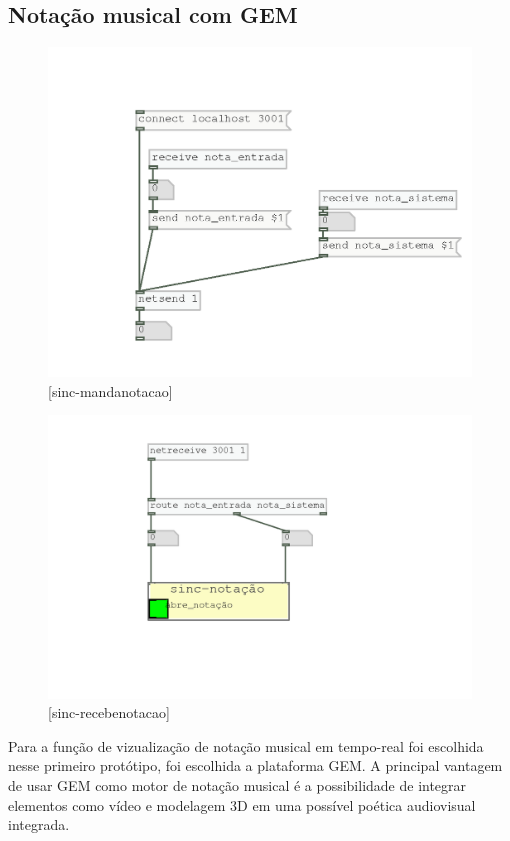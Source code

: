 \documentclass{ppgmus}
\begin{document}
\subsection{Notação musical com GEM}

\begin{figure}
\includegraphics[scale=.6]{sinc-mandanotacao}
\caption{[sinc-mandanotacao]}
\label{sinc-mandanotacao}
\end{figure} 

\begin{figure}
\includegraphics[scale=.6]{sinc-recebenotacao}
\caption{[sinc-recebenotacao]}
\label{sinc-recebenotacao}
\end{figure} 

Para a função de vizualização de notação musical
em tempo-real foi escolhida nesse primeiro protótipo, foi escolhida a plataforma GEM.
A principal vantagem de usar GEM como motor de notação musical é a possibilidade
de integrar elementos como vídeo e modelagem 3D em uma possível poética audiovisual integrada.
\end{document}
